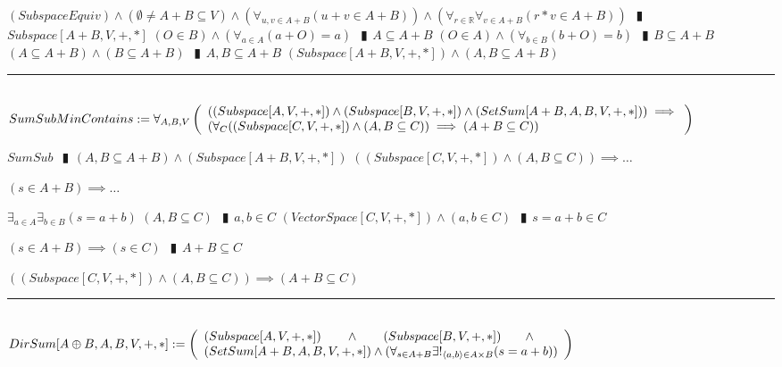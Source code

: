 \documentclass{book}
\newcommand{\abr}{:=}
\newcommand{\pipe}{$\phantom{(}\vrectangleblack\phantom{)}$}
\begin{document}
\begin{shaded}
\begin{enumerate}
    \lit $(SubspaceEquiv) \land (\emptyset \neq A + B \subseteq V) \land (\forall_{u, v \in A + B}(u + v \in A + B)) \land (\forall_{r \in \mathbb{R}} \forall_{v \in A + B}(r * v \in A + B))$ \pipe $Subspace[A + B, V, + ,*]$
    \lit $(O \in B) \land (\forall_{a \in A}(a + O) = a)$ \pipe $A \subseteq A + B$
    \lit $(O \in A) \land (\forall_{b \in B}(b + O) = b)$ \pipe $B \subseteq A + B$
    \lit $(A \subseteq A + B) \land (B \subseteq A + B)$ \pipe $A, B \subseteq A + B$
    \lit $(Subspace[A + B, V, + ,*]) \land (A, B \subseteq A + B)$
  \end{enumerate} \vspace{.75mm} \hrule \vspace{.75mm} \ \\

  $SumSubMinContains \abr \forall_{A, B, V}\left(\begin{array}{ll}
    ((Subspace[A, V, +, *]) \land (Subspace[B, V, +, *]) \land (SetSum[A + B, A, B, V, +, *])) \hfill \implies \hfill \\
    (\forall_{C}((Subspace[C, V, + ,*]) \land (A, B \subseteq C)) \implies (A + B \subseteq C))
  \end{array}\right)$
  \begin{enumerate}
    \lit $SumSub$ \pipe $(A, B \subseteq A + B) \land (Subspace[A + B, V, + ,*])$
    \lit $((Subspace[C, V, + ,*]) \land (A, B \subseteq C)) \implies \ldots$
    \begin{enumerate}
      \lit $(s \in A + B) \implies \ldots$
      \begin{enumerate}
        \lit $\exists_{a \in A} \exists_{b \in B}(s = a + b)$
        \lit $(A, B \subseteq C)$ \pipe $a, b \in C$
        \lit $(VectorSpace[C, V, + ,*]) \land (a, b \in C)$ \pipe $s = a + b \in C$
      \end{enumerate}
      \lit $(s \in A + B) \implies (s \in C)$ \pipe $A + B \subseteq C$
    \end{enumerate}
    \lit $((Subspace[C, V, + ,*]) \land (A, B \subseteq C)) \implies (A + B \subseteq C)$
  \end{enumerate} \vspace{.75mm} \hrule \vspace{.75mm} \ \\ 

  $DirSum[A \oplus B, A, B, V, +, *] \abr \left(\begin{array}{ll}
    (Subspace[A, V, +, *]) \hfill \land \hfill (Subspace[B, V, +, *]) \hfill \land \hfill \\
    (SetSum[A + B, A, B, V, +, *]) \hfill \land \hfill (\forall_{s \in A + B} \exists!_{\langle a, b \rangle \in A \times B}(s = a + b))
  \end{array}\right)$ \\


\end{shaded}
\end{document}
